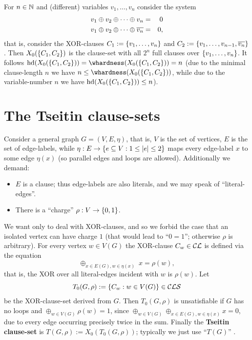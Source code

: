 \documentclass[12pt]{book}
\begin{document}
\begin{examp}\label{exp:2xor0}
  \cite{h8} For $n \in \mathbb{N}$ and (different) variables $v_1,\dots,v_n$ consider the system
  \begin{eqnarray*}
    v_1 \oplus v_2 \oplus \dots \oplus v_n &=& 0 \\
    v_1 \oplus v_2 \oplus \dots \oplus \overline{v_n} &=& 0,
  \end{eqnarray*}
  that is, consider the XOR-clauses $C_1 := \{ v_1,\dots,v_n \}$ and $C_2 := \{ v_1,\dots,v_{n-1},\overline{v_n} \}$. Then $X_0(\{ C_1,C_2 \})$ 
  is the clause-set with all $2^n$ full clauses over $\{ v_1,\dots,v_n \}$. It follows $\hardness(X_0(\set{C_1,C_2})) = \whardness(X_0(\set{C_1,C_2})) = n$ (due to the minimal 
  clause-length $n$ we have $n \le \whardness(X_0(\set{C_1,C_2}))$, while due to the variable-number $n$ we have $\operatorname{hd}(X_0(\{ C_1,C_2 \})) \le n$).
\end{examp}


\section{The Tseitin clause-sets}
\label{sec:Tseitin cls}

Consider a general graph $G = (V,E,\eta)$, that is, $V$ is the set of vertices, $E$ is the set of edge-labels, while 
$\eta: E \rightarrow \{ e \subseteq V : 1 \le \lvert e \rvert \le 2 \}$ maps every edge-label $x$ to some edge $\eta(x)$ (so parallel edges and loops are allowed). 
Additionally we demand:
\begin{itemize}
\item $E$ is a clause; thus edge-labels are also literals, and we may speak of ``literal-edges''.
\item There is a ``charge'' $\rho: V \rightarrow \{ 0,1 \}$.
\end{itemize}
We want only to deal with XOR-clauses, and so we forbid the case that an isolated vertex can have charge $1$ (that would lead to ``$0 = 1$''; 
otherwise $\rho$ is arbitrary). For every vertex $w \in V(G)$ the XOR-clause $C_w \in \mathcal{CL}$ is defined via the equation
\begin{displaymath}
  \oplus_{x \in E(G), w \in \eta(x)} \; x = \rho(w),
\end{displaymath}
that is, the XOR over all literal-edges incident with $w$ is $\rho(w)$. Let
\begin{displaymath}
  T_0(G,\rho) := \{ C_w : w \in V(G) \} \in \mathcal{CLS}
\end{displaymath}
be the XOR-clause-set derived from $G$. Then $T_0(G,\rho)$ is unsatisfiable if $G$ has no loops and  $\oplus_{w \in V(G)} \rho(w) = 1$, since 
$\oplus_{w \in V(G)} \oplus_{x \in E(G), w \in \eta(x)} x = 0$, due to every edge occurring precisely twice in the sum. Finally the 
\textbf{Tseitin clause-set} is $T(G,\rho) := X_0(T_0(G,\rho))$; typically we just use ``$T(G)$'' \cite{h8}.
\end{document}
